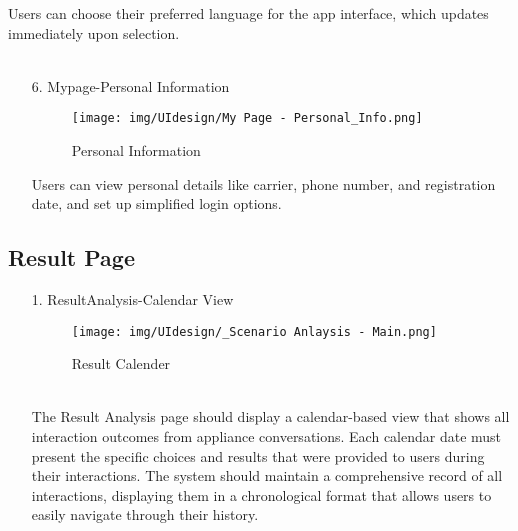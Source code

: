 \documentclass[conference]{IEEEtran}
\begin{document}
\begin{enumerate}
\begin{itemize}
\begin{itemize}
\begin{enumerate}
\begin{enumerate}
    Users can choose their preferred language for the app interface, which updates immediately upon selection. \\ \\
\end{enumerate}

\begin{enumerate}
    \item[6.] Mypage-Personal Information
    \begin{figure}[h]
        {\centering
        \hspace{4cm}
        \begin{minipage}{0.4\columnwidth}
            \texttt{[image: img/UIdesign/My Page - Personal\_Info.png]}
            \caption{Personal Information}
        \end{minipage}}
    \end{figure}

    Users can view personal details like carrier, phone number, and registration date, and set up simplified login options.
\end{enumerate}


\subsection{Result Page}
    \begin{enumerate}
        \item[1.] ResultAnalysis-Calendar View
        \begin{figure}[h]
        {\centering
        \hspace{4cm}
        \begin{minipage}{0.4\columnwidth}
            \texttt{[image: img/UIdesign/\_Scenario Anlaysis - Main.png]}
            \caption{Result Calender}
        \end{minipage}}
    \end{figure}
        \\ The Result Analysis page should display a calendar-based view that shows all interaction outcomes from appliance conversations. Each calendar date must present the specific choices and results that were provided to users during their interactions. The system should maintain a comprehensive record of all interactions, displaying them in a chronological format that allows users to easily navigate through their history.\\
    \end{enumerate}
    

\end{enumerate}
\end{itemize}
\end{itemize}
\end{enumerate}
\end{document}
